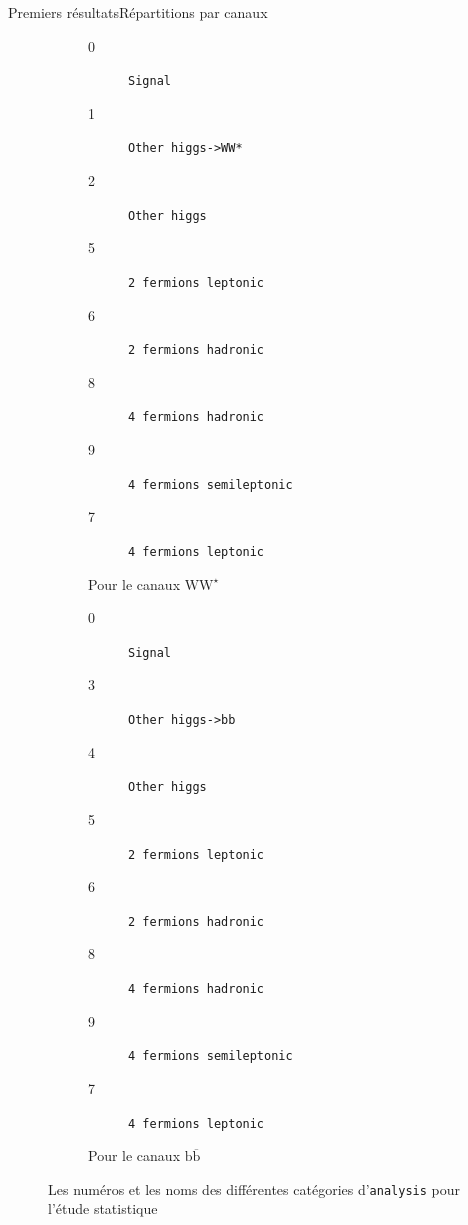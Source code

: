 \documentclass[9pt]{beamer}
\newcommand{\bbar}{\overline{b}}
\newcommand{\Wstar}{W^{\star}}
\newcommand{\bb}{$\mathrm{b\bbar}$\xspace}
\newcommand{\WW}{$\mathrm{W\Wstar}$\xspace}
\begin{document}
\begin{frame}{Premiers résultats}{Répartitions par canaux}
		
\begin{figure}[!ht]
	\centering
	\begin{subfigure}[b]{0.45\textwidth}
		\begin{description}
			\item[0] \texttt{Signal}
			\item[1] \texttt{Other higgs->WW*}
			\item[2] \texttt{Other higgs}
			\item[5] \texttt{2 fermions leptonic}
			\item[6] \texttt{2 fermions hadronic}
			\item[8] \texttt{4 fermions hadronic}
			\item[9] \texttt{4 fermions semileptonic}
			\item[7] \texttt{4 fermions leptonic}
		\end{description}
		\caption{Pour le canaux \WW}
	\end{subfigure}
     \hfill
	\begin{subfigure}[b]{0.45\textwidth}
		\begin{description}
			\item[0] \texttt{Signal}
			\item[3] \texttt{Other higgs->bb}
			\item[4] \texttt{Other higgs}
			\item[5] \texttt{2 fermions leptonic}
			\item[6] \texttt{2 fermions hadronic}
			\item[8] \texttt{4 fermions hadronic}
			\item[9] \texttt{4 fermions semileptonic}
			\item[7] \texttt{4 fermions leptonic}
		\end{description}
		\caption{Pour le canaux \bb}
		\label{stats:results:bb}
	\end{subfigure}
	\caption{Les numéros et les noms des différentes catégories d'\texttt{analysis} pour l'étude statistique}
\end{figure}

\end{frame}
\end{document}

